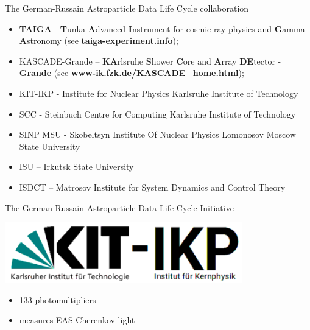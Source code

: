 \documentclass[18pt]{beamer}
\begin{document}


\appendix
\beginbackup

\begin{frame}
{The German-Russain Astroparticle Data Life Cycle collaboration}
    \begin{itemize}
	\item \textbf{\textcolor{kit-green100}{TAIGA}} - \textbf{\textcolor{kit-green100}{T}}unka \textbf{\textcolor{kit-green100}{A}}dvanced 
	\textbf{\textcolor{kit-blue70}{I}}nstrument for cosmic ray physics and \textbf{\textcolor{kit-green100}{G}}amma 
	\textbf{\textcolor{kit-green100}{A}}stronomy (see \textbf{\textcolor{kit-green100}{
	taiga-experiment.info}});
	\item KASCADE-Grande -- \textbf{\textcolor{kit-green100}{KA}}rlsruhe \textbf{\textcolor{kit-green100}{S}}hower 
	\textbf{\textcolor{kit-green100}{C}}ore and \textbf{\textcolor{kit-green100}{A}}rray \textbf{\textcolor{kit-green100}{DE}}tector 
	- \textbf{\textcolor{kit-orange70}{Grande}} 
	(see \textbf{\textcolor{kit-green100}{
	www-ik.fzk.de/KASCADE\_home.html}});
	\item KIT-IKP - Institute for Nuclear Physics Karlsruhe Institute of Technology
	\item SCC - Steinbuch Centre for Computing Karlsruhe Institute of Technology
	\item SINP MSU - Skobeltsyn Institute Of Nuclear Physics Lomonosov Moscow State University
	\item ISU -- Irkutsk State University
	\item ISDCT -- Matrosov Institute for System Dynamics and Control Theory
    \end{itemize}
\end{frame}

\begin{frame}{The German-Russain Astroparticle Data Life Cycle Initiative}
 \vspace{-2em}
\begin{minipage}[t]{0.41\textwidth}
    \parbox[c][0.20\textheight][t]{1\textwidth}{
      \centering
      \includegraphics[width=0.7742\textwidth]{pics/ikp-0.pdf}
    }
\vspace{-2em}
    \parbox[c][0.15\textheight][t]{1\textwidth}{
      \begin{itemize}
        \setlength{\itemsep}{0pt}
        \item 133 photomultipliers
        \item measures EAS Cherenkov light
      \end{itemize}
    }
\end{minipage}
\hfill
\end{frame}


\backupend
\end{document}
